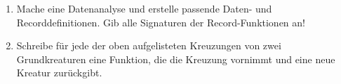 \begin{aufgabe}
  \begin{enumerate}

  \item Mache eine Datenanalyse und erstelle
    passende Daten- und Recorddefinitionen.  Gib alle
    Signaturen der Record-Funktionen an!

  \item Schreibe für jede der oben aufgelisteten
    Kreuzungen von zwei Grundkreaturen eine Funktion, die die Kreuzung
    vornimmt und eine neue Kreatur zurückgibt.
  \end{enumerate}
\end{aufgabe}


